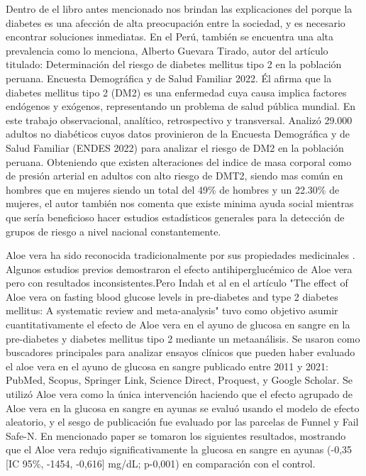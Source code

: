 Dentro de el libro antes mencionado nos brindan las explicaciones del porque la diabetes es una afección de alta preocupación entre la sociedad, y es necesario encontrar soluciones inmediatas. En el Perú, también se encuentra una alta prevalencia como lo menciona, Alberto Guevara Tirado, autor del artículo titulado: Determinación del riesgo de diabetes mellitus tipo 2 en la población peruana. Encuesta Demográfica y de Salud Familiar 2022. Él afirma que la diabetes mellitus tipo 2 (DM2) es una enfermedad cuya causa implica factores endógenos y exógenos, representando un problema de salud pública mundial. 
En este trabajo observacional, analítico, retrospectivo y transversal. Analizó 29.000 adultos no diabéticos cuyos datos provinieron de la Encuesta Demográfica y de Salud Familiar (ENDES 2022) para analizar el riesgo de DM2 en la población peruana. Obteniendo que existen alteraciones del indice de masa corporal como de presión arterial en adultos con alto riesgo de DMT2, siendo mas común en hombres que en mujeres siendo un total del 49\% de hombres y un 22.30\% de mujeres, el autor también nos comenta que existe minima ayuda social mientras que sería beneficioso hacer estudios estadísticos generales para la detección de grupos de riesgo a nivel nacional constantemente.\cite{GuevaraTirado2024}

Aloe vera ha sido reconocida tradicionalmente por sus propiedades medicinales \cite{Ushasree2024}. Algunos estudios previos demostraron el efecto antihiperglucémico de Aloe vera pero con resultados inconsistentes.Pero Indah et al en el artículo "The effect of Aloe vera on fasting blood glucose levels in pre-diabetes and type 2 diabetes mellitus: A systematic review and meta-analysis" tuvo como objetivo asumir cuantitativamente el efecto de Aloe vera en el ayuno de glucosa en sangre en la pre-diabetes y diabetes mellitus tipo 2 mediante un metaanálisis.\cite{Budiastutik2022}
Se usaron como buscadores principales para analizar ensayos clínicos que pueden haber evaluado el aloe vera en el ayuno de glucosa en sangre publicado entre 2011 y 2021: PubMed, Scopus, Springer Link, Science Direct, Proquest, y Google Scholar. Se utilizó Aloe vera como la única intervención haciendo que el efecto agrupado de Aloe vera en la glucosa en sangre en ayunas se evaluó usando el modelo de efecto aleatorio, y el sesgo de publicación fue evaluado por las parcelas de Funnel y Fail Safe-N. En mencionado paper se tomaron los siguientes resultados, mostrando que el Aloe vera redujo significativamente la glucosa en sangre en ayunas (-0,35 [IC 95\%, -1454, -0,616] mg/dL; p-0,001) en comparación con el control. 

